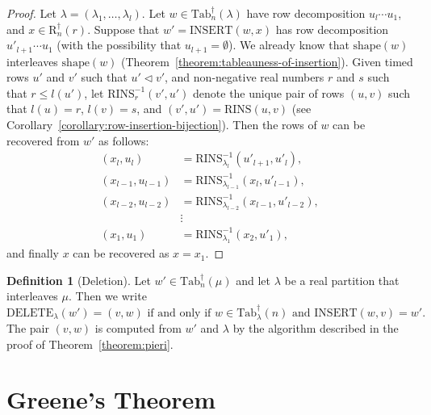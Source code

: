 \documentclass[10pt]{amsproc}
\theoremstyle{definition}
\newtheorem{definition}[theorem]{Definition}
\theoremstyle{remark}
\newcommand{\rowins}{\mathrm{RINS}}
\newcommand{\ins}{\mathrm{INSERT}}
\newcommand{\del}{\mathrm{DELETE}}
\newcommand{\shape}{\mathrm{shape}}
\newcommand{\ttab}{\mathrm{Tab}^\dagger}
\newcommand{\tr}{\mathrm{R}^\dagger}
\begin{document}
\begin{proof}
  Let $\lambda=(\lambda_1,\dotsc,\lambda_l)$.
  Let $w\in \ttab_n(\lambda)$ have row decomposition $u_l\dotsb u_1$, and $x\in \tr_n(r)$.
  Suppose that $w'=\ins(w,x)$ has row decomposition $u'_{l+1}\dotsb u_1$ (with the possibility that $u_{l+1}=\emptyset$).
  We already know that $\shape(w)$ interleaves $\shape(w)$ (Theorem~\ref{theorem:tableauness-of-insertion}).
  Given timed rows $u'$ and $v'$ such that $u'\lhd v'$, and non-negative real numbers $r$ and $s$ such that $r\leq l(u')$, let $\rowins^{-1}_r(v',u')$ denote the unique pair of rows $(u,v)$ such that $l(u)=r$, $l(v)=s$, and $(v',u')=\rowins(u,v)$ (see Corollary~\ref{corollary:row-insertion-bijection}).
  Then the rows of $w$ can be recovered from $w'$ as follows:
  \begin{align*}
    (x_l, u_l) & = \rowins^{-1}_{\lambda_l}(u'_{l+1},u'_l),\\
    (x_{l-1},u_{l-1}) & = \rowins^{-1}_{\lambda_{l-1}}(x_l,u'_{l-1}),\\
    (x_{l-2},u_{l-2}) & = \rowins^{-1}_{\lambda_{l-2}}(x_{l-1},u'_{l-2}),\\
    &\vdots\\
    (x_1,u_1) & = \rowins^{-1}_{\lambda_1}(x_2,u'_1),
  \end{align*}
  and finally $x$ can be recovered as $x=x_1$.
\end{proof}
\begin{definition}
  [Deletion]
  \label{definition:deletion}
  Let $w'\in \ttab_n(\mu)$ and let $\lambda$ be a real partition that interleaves $\mu$.
  Then we write
  \begin{displaymath}
    \del_\lambda(w')=(v,w) \text{ if and only if } w\in \ttab_\lambda(n) \text{ and }\ins(w,v)=w'.
  \end{displaymath}
  The pair $(v,w)$ is computed from $w'$ and $\lambda$ by the algorithm described in the proof of Theorem~\ref{theorem:pieri}.
\end{definition}
\section{Greene's Theorem}
\label{sec:greene}
\end{document}
